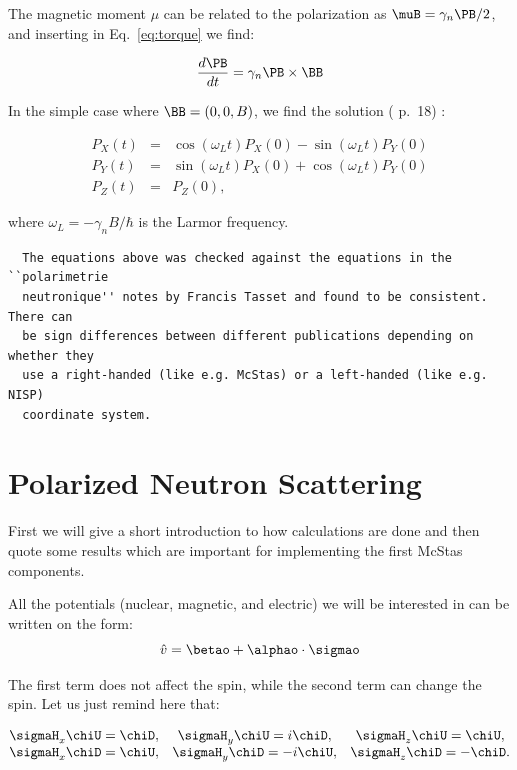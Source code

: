 The magnetic moment $\mu$ can be related to the polarization as $\muB
= \gamma_n \PB/2$, and inserting in Eq.~\ref{eq:torque} we find:

\begin{equation}
  \label{eq:pol_magnetic}
  \frac{d\PB}{dt} = \gamma_n \PB \times \BB
\end{equation}

In the simple case where $\BB = (0, 0, B)$, we find the solution
(\cite{gavin} p.~18) :

\begin{eqnarray}
  \nonumber
  P_X(t) & = & \cos(\omega_L t) P_X(0) - \sin(\omega_L t) P_Y(0) \\
  \label{eq:precession}
  P_Y(t) & = & \sin(\omega_L t) P_X(0) + \cos(\omega_L t) P_Y(0) \\
  \nonumber
  P_Z(t) & = & P_Z(0),
\end{eqnarray}

where $\omega_L = -\gamma_n B/\hbar$ is the Larmor frequency.\\

\begin{lstlisting}
  The equations above was checked against the equations in the ``polarimetrie
  neutronique'' notes by Francis Tasset and found to be consistent. There can
  be sign differences between different publications depending on whether they
  use a right-handed (like e.g. McStas) or a left-handed (like e.g. NISP)
  coordinate system.
\end{lstlisting}

\section{Polarized Neutron Scattering}
\label{sec:scat}

First we will give a short introduction to how calculations are done
and then quote some results which are important for implementing the
first McStas components.

All the potentials (nuclear, magnetic, and electric) we will be interested in
can be written on the form:
\begin{equation}
  \label{eq:general_pot}
  \hat{v} = \betao + \alphao \cdot \sigmao
\end{equation}

The first term does not affect the spin, while the second term can
change the spin. Let us just remind here that:

\begin{equation}
  \label{eq:pauli_rules}
  \begin{matrix}
    \sigmaH_x \chiU = \chiD, &
    \sigmaH_y \chiU = i\chiD, &
    \sigmaH_z \chiU = \chiU, \\
    \sigmaH_x \chiD = \chiU, &
    \sigmaH_y \chiD = -i\chiU, &
    \sigmaH_z \chiD = -\chiD.
  \end{matrix}
\end{equation}

